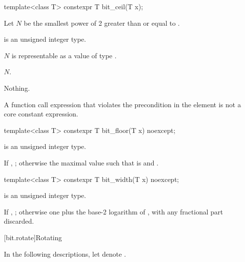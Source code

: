%
\begin{itemdecl}
template<class T>
  constexpr T bit_ceil(T x);
\end{itemdecl}

\begin{itemdescr}
\pnum
Let $N$ be the smallest power of 2 greater than or equal to .

\pnum
\constraints
{} is an unsigned integer type.

\pnum
\expects
$N$ is representable as a value of type .

\pnum
\returns
$N$.

\pnum
\throws
Nothing.

\pnum
\remarks
A function call expression
that violates the precondition in the \expects element
is not a core constant expression.
\end{itemdescr}

%
\begin{itemdecl}
template<class T>
  constexpr T bit_floor(T x) noexcept;
\end{itemdecl}

\begin{itemdescr}
\pnum
\constraints
{} is an unsigned integer type.

\pnum
\returns
If , ;
otherwise the maximal value 
such that  is  and .

\end{itemdescr}

%
\begin{itemdecl}
template<class T>
  constexpr T bit_width(T x) noexcept;
\end{itemdecl}

\begin{itemdescr}
\pnum
\constraints
{} is an unsigned integer type.

\pnum
\returns
If , ;
otherwise one plus the base-2 logarithm of ,
with any fractional part discarded.

\end{itemdescr}

[bit.rotate]{Rotating}

In the following descriptions,
let  denote .

